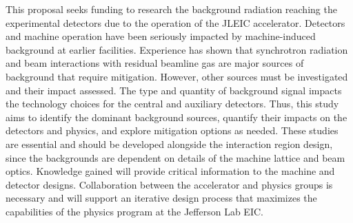 This proposal seeks funding to research the background radiation reaching the experimental detectors due to the operation of the JLEIC accelerator.  Detectors and machine operation have been seriously impacted by machine-induced background at earlier facilities.  Experience has shown that synchrotron radiation and beam interactions with residual beamline gas are major sources of background that require mitigation.  However, other sources must be investigated and their impact assessed.  The type and quantity of background signal impacts the technology choices for the central and auxiliary detectors.  Thus, this study aims to identify the dominant background sources, quantify their impacts on the detectors and physics, and explore mitigation options as needed.  These studies are essential and should be developed alongside the interaction region design, since the backgrounds are dependent on details of the machine lattice and beam optics.  Knowledge gained will provide critical information to the machine and detector designs.  Collaboration between the accelerator and physics groups is necessary and will support an iterative design process that maximizes the capabilities of the physics program at the Jefferson Lab EIC.

